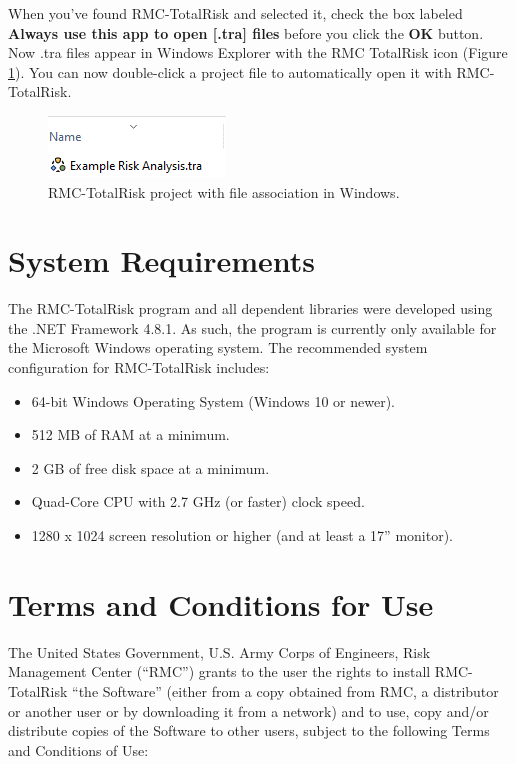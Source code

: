 \documentclass[
]{book}
\begin{document}
When you've found RMC-TotalRisk and selected it, check the box labeled \textbf{Always use this app to open {[}.tra{]} files} before you click the \textbf{OK} button. Now .tra files appear in Windows Explorer with the RMC TotalRisk icon (Figure \ref{fig:figure-3}). You can now double-click a project file to automatically open it with RMC-TotalRisk.

\begin{figure}

{\centering \includegraphics{images/figure3} 

}

\caption{RMC-TotalRisk project with file association in Windows.}\label{fig:figure-3}
\end{figure}

\hypertarget{system-requirements}{%
\section{System Requirements}\label{system-requirements}}

The RMC-TotalRisk program and all dependent libraries were developed using the .NET Framework 4.8.1. As such, the program is currently only available for the Microsoft Windows operating system. The recommended system configuration for RMC-TotalRisk includes:

\begin{itemize}
\item
  64-bit Windows Operating System (Windows 10 or newer).
\item
  512 MB of RAM at a minimum.
\item
  2 GB of free disk space at a minimum.
\item
  Quad-Core CPU with 2.7 GHz (or faster) clock speed.
\item
  1280 x 1024 screen resolution or higher (and at least a 17'' monitor).
\end{itemize}

\hypertarget{terms-and-conditions-for-use}{%
\section{Terms and Conditions for Use}\label{terms-and-conditions-for-use}}

The United States Government, U.S. Army Corps of Engineers, Risk Management Center (``RMC'') grants to the user the rights to install RMC-TotalRisk ``the Software'' (either from a copy obtained from RMC, a distributor or another user or by downloading it from a network) and to use, copy and/or distribute copies of the Software to other users, subject to the following Terms and Conditions of Use:
\end{document}
